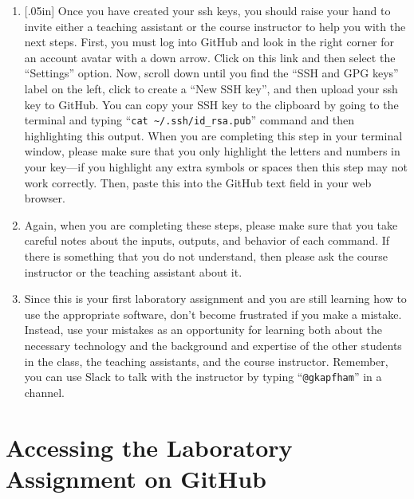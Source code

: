 \documentclass[11pt]{article}
\newcommand{\command}[1]{``\lstinline{#1}''}
\newcommand{\caution}[1]{\null\hfill\LARGE{\faWarning{}}\newline\scriptsize{\em{#1}}}
\begin{document}
\begin{enumerate}
  \item \marginnote{\caution{Upload keys correctly}}[.05in] Once you have
    created your ssh keys, you should raise your hand to invite either a
    teaching assistant or the course instructor to help you with the next
    steps. First, you must log into GitHub and look in the right corner for an
    account avatar with a down arrow. Click on this link and then select the
    ``Settings'' option. Now, scroll down until you find the ``SSH and GPG
    keys'' label on the left, click to create a ``New SSH key'', and then
    upload your ssh key to GitHub. You can copy your SSH key to the clipboard
    by going to the terminal and typing ``{\tt cat
    \textasciitilde{}/.ssh/id\_rsa.pub}'' command and then highlighting this
    output. When you are completing this step in your terminal window, please
    make sure that you only highlight the letters and numbers in your key---if
    you highlight any extra symbols or spaces then this step may not work
    correctly. Then, paste this into the GitHub text field in your web browser.

  \item Again, when you are completing these steps, please make sure that you take careful notes about the inputs,
    outputs, and behavior of each command. If there is something that you do not understand, then please ask the course
    instructor or the teaching assistant about it.

  \item Since this is your first laboratory assignment and you are still learning how to use the appropriate software,
    don't become frustrated if you make a mistake. Instead, use your mistakes as an opportunity for learning both about
    the necessary technology and the background and expertise of the other students in the class, the teaching
    assistants, and the course instructor. Remember, you can use Slack to talk with the instructor by typing
    \command{@gkapfham} in a channel.

\end{enumerate}

\section*{Accessing the Laboratory Assignment on GitHub}
\end{document}
